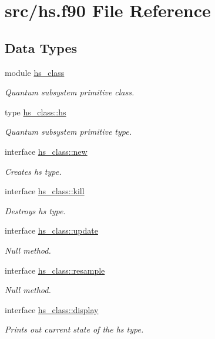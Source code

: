 \hypertarget{hs_8f90}{\section{src/hs.f90 File Reference}
\label{hs_8f90}
}
\subsection*{Data Types}
\begin{DoxyCompactItemize}
\item 
module \hyperlink{classhs__class}{hs\-\_\-class}
\begin{DoxyCompactList}\small\item\em Quantum subsystem primitive class. \end{DoxyCompactList}\item 
type \hyperlink{strucths__class_1_1hs}{hs\-\_\-class\-::hs}
\begin{DoxyCompactList}\small\item\em Quantum subsystem primitive type. \end{DoxyCompactList}\item 
interface \hyperlink{interfacehs__class_1_1new}{hs\-\_\-class\-::new}
\begin{DoxyCompactList}\small\item\em Creates hs type. \end{DoxyCompactList}\item 
interface \hyperlink{interfacehs__class_1_1kill}{hs\-\_\-class\-::kill}
\begin{DoxyCompactList}\small\item\em Destroys hs type. \end{DoxyCompactList}\item 
interface \hyperlink{interfacehs__class_1_1update}{hs\-\_\-class\-::update}
\begin{DoxyCompactList}\small\item\em Null method. \end{DoxyCompactList}\item 
interface \hyperlink{interfacehs__class_1_1resample}{hs\-\_\-class\-::resample}
\begin{DoxyCompactList}\small\item\em Null method. \end{DoxyCompactList}\item 
interface \hyperlink{interfacehs__class_1_1display}{hs\-\_\-class\-::display}
\begin{DoxyCompactList}\small\item\em Prints out current state of the hs type. \end{DoxyCompactList}\item 

\end{DoxyCompactItemize}
